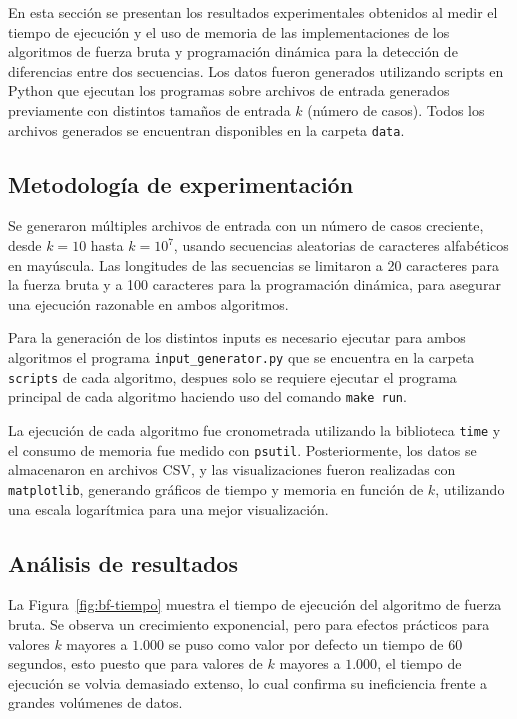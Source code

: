 En esta sección se presentan los resultados experimentales obtenidos al medir el tiempo de ejecución y el uso de memoria de las implementaciones de los algoritmos de fuerza bruta y programación dinámica para la detección de diferencias entre dos secuencias. Los datos fueron generados utilizando scripts en Python que ejecutan los programas sobre archivos de entrada generados previamente con distintos tamaños de entrada $k$ (número de casos). Todos los archivos generados se encuentran disponibles en la carpeta \texttt{data}.

\subsection{Metodología de experimentación}

Se generaron múltiples archivos de entrada con un número de casos creciente, desde $k=10$ hasta $k=10^7$, usando secuencias aleatorias de caracteres alfabéticos en mayúscula. Las longitudes de las secuencias se limitaron a 20 caracteres para la fuerza bruta y a 100 caracteres para la programación dinámica, para asegurar una ejecución razonable en ambos algoritmos.

Para la generación de los distintos inputs es necesario ejecutar para ambos algoritmos el programa \texttt{input\_generator.py} que se encuentra en la carpeta \texttt{scripts} de cada algoritmo, despues solo se requiere ejecutar el programa principal de cada algoritmo haciendo uso del comando \lstinline|make run|. 

La ejecución de cada algoritmo fue cronometrada utilizando la biblioteca \texttt{time} y el consumo de memoria fue medido con \texttt{psutil}. Posteriormente, los datos se almacenaron en archivos CSV, y las visualizaciones fueron realizadas con \texttt{matplotlib}, generando gráficos de tiempo y memoria en función de $k$, utilizando una escala logarítmica para una mejor visualización.

\subsection{Análisis de resultados}

La Figura~\ref{fig:bf-tiempo} muestra el tiempo de ejecución del algoritmo de fuerza bruta. Se observa un crecimiento exponencial, pero para efectos prácticos para valores $k$ mayores a $1.000$ se puso como valor por defecto un tiempo de 60 segundos, esto puesto que para valores de $k$ mayores a $1.000$, el tiempo de ejecución se volvia demasiado extenso, lo cual confirma su ineficiencia frente a grandes volúmenes de datos.

